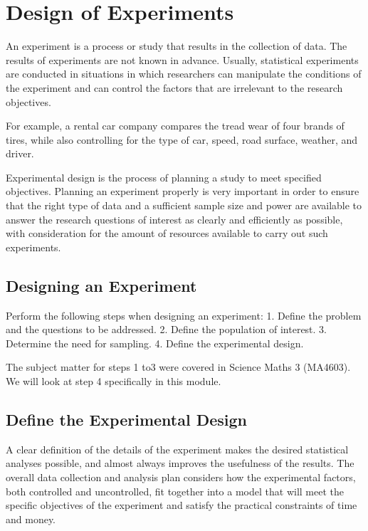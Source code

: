 \documentclass[a4paper,12pt]{article}
\begin{document}

\section{Design of Experiments}


An experiment is a process or study that results in the collection of data. The results of experiments are not known in advance. Usually, statistical experiments are conducted in situations in which researchers can manipulate the conditions of the experiment and can control the factors that are irrelevant to the research objectives. 

For example, a rental car company compares the tread wear of four brands of tires, while also controlling for the type of car, speed, road surface, weather, and driver.

Experimental design is the process of planning a study to meet specified objectives. Planning an experiment properly is very important in order to ensure that the right type of data and a sufficient sample size and power are available to answer the research questions of interest as clearly and efficiently as possible, with consideration for the amount of resources available to carry out such experiments.


\subsection{Designing an Experiment}
Perform the following steps when designing an experiment:
1. Define the problem and the questions to be addressed.
2. Define the population of interest.
3. Determine the need for sampling.
4. Define the experimental design.

The subject matter for steps 1 to3 were covered in Science Maths 3 (MA4603). We will look at step 4 specifically in this module.

\subsection{Define the Experimental Design}
A clear definition of the details of the experiment makes the desired statistical analyses possible, and almost always improves the usefulness of the results. The overall data collection and analysis plan considers how the experimental factors, both controlled and uncontrolled, fit together into a model that will meet the specific objectives of the experiment and satisfy the practical constraints of time and money.
\end{document}
